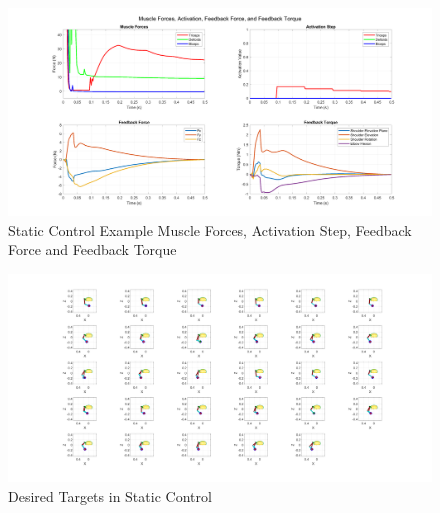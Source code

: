 \begin{figure}[h!]
\centering
\includegraphics[width=1\textwidth]{Pictures/Controller/StaticControl.png} 
\caption{Static Control Example Muscle Forces, Activation Step, Feedback Force and Feedback Torque } %
\label{fig:SC} %
\end{figure}
\newpage
\begin{landscape} %
  \begin{figure}[h!]
    \centering
    \includegraphics[width=1.9\textwidth]{Pictures/Controller/Static29positions.png} %
    \caption{Desired Targets in Static Control} %
  \end{figure}
\end{landscape} %




